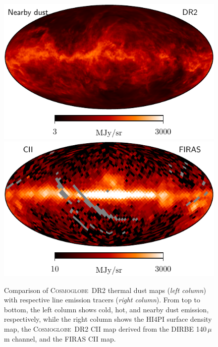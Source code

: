 \documentclass{aa}
\def\Cosmoglobe{\textsc{Cosmoglobe}}
\begin{document}
\begin{figure}
  \includegraphics[width=0.49\linewidth]{figures/CGDR2_neardust_1deg_n512_v1.pdf}
  \includegraphics[width=0.49\linewidth]{figures/init_CII_firas_n16_v20.pdf}
  \caption{Comparison of \Cosmoglobe\ DR2 thermal dust maps (\emph{left column}) with respective line emission tracers (\emph{right column}). From top to bottom, the left column shows cold, hot, and nearby dust emission, respectively, while the right column shows the HI4PI surface density map, the \Cosmoglobe\ DR2 CII map derived from the DIRBE 140\,$\mu$m channel, and the FIRAS CII map.  }
  \label{fig:dustmaps}
\end{figure}
\end{document}
